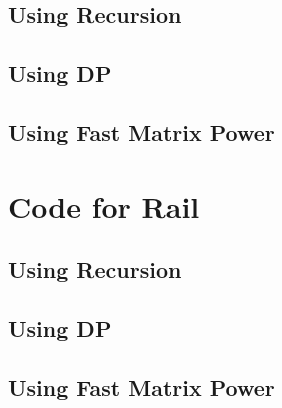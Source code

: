 \subsection{Using Recursion}


\subsection{Using DP}


\subsection{Using Fast Matrix Power}


\section{Code for Rail}
\label{Rail Code}
\subsection{Using Recursion}

\subsection{Using DP}

\subsection{Using Fast Matrix Power}
